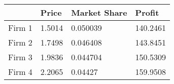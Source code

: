 \begin{tabular}{llll}
& Price & Market Share & Profit \\ 
\hline 
Firm 1 & 1.5014 & 0.050039 & 140.2461 \\ 
Firm 2 & 1.7498 & 0.046408 & 143.8451 \\ 
Firm 3 & 1.9836 & 0.044704 & 150.5309 \\ 
Firm 4 & 2.2065 & 0.04427 & 159.9508 \\ 
\hline 
\end{tabular}